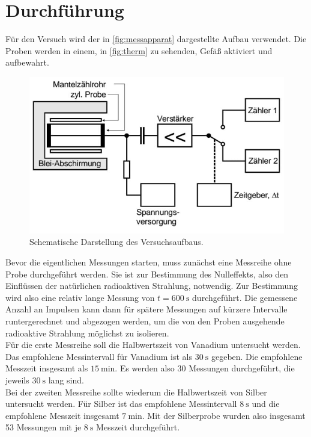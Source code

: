 \section{Durchführung}
\label{sec:Durchführung}

Für den Versuch wird der in \autoref{fig:messapparat} dargestellte Aufbau verwendet. Die Proben werden in einem, in \autoref{fig:therm} zu sehenden, Gefäß aktiviert und aufbewahrt.

\begin{figure}[H]
    \centering
    \includegraphics[width=\textwidth]{data/messapparat.jpeg}
    \caption{Schematische Darstellung des Versuchsaufbaus.}
    \label{fig:messapparat}
\end{figure}

Bevor die eigentlichen Messungen starten, muss zunächst eine Messreihe ohne Probe durchgeführt werden. Sie ist zur Bestimmung des Nulleffekts, also den Einflüssen
der natürlichen radioaktiven Strahlung, notwendig. Zur Bestimmung wird also eine relativ lange Messung von $t = \SI{600}{\second}$ durchgeführt. Die gemessene Anzahl
an Impulsen kann dann für spätere Messungen auf kürzere Intervalle runtergerechnet und abgezogen werden, um die von den Proben ausgehende radioaktive Strahlung möglichst
zu isolieren.\\
\newline
Für die erste Messreihe soll die Halbwertszeit von Vanadium untersucht werden. Das empfohlene Messintervall für Vanadium ist als $\SI{30}{\second}$ gegeben. Die
empfohlene Messzeit insgesamt als $\SI{15}{\minute}$. Es werden also 30 Messungen durchgeführt, die jeweils $\SI{30}{\second}$ lang sind.\\
Bei der zweiten Messreihe sollte wiederum die Halbwertszeit von Silber untersucht werden. Für Silber ist das empfohlene Messintervall $\SI{8}{\second}$ und die
empfohlene Messzeit insgesamt $\SI{7}{\minute}$. Mit der Silberprobe wurden also insgesamt 53 Messungen mit je $\SI{8}{\second}$ Messzeit durchgeführt.